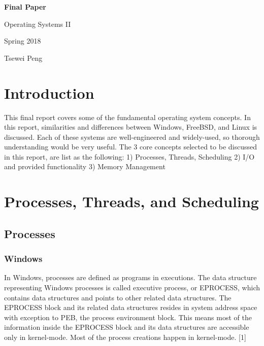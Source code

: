 \documentclass[10pt,a4paper]{article}
\def \CourseName{Operating Systems II}
\def \AssignmentTitle{Final Paper}
\def \Author{Tsewei Peng}
\def \Term{Spring 2018}
\begin{document}
\begin{titlepage}
    \vspace*{120px}
    \begin{center}
    {\huge \textbf{\AssignmentTitle}}\par
    \vspace{400px}
    {\Huge \CourseName}\par
    \vspace{10px}
    {\large\Term}\par
    \vspace{10px}
    \Large \Author
    \end{center}
    \vspace*{\fill}
\end{titlepage}



\section{Introduction}
This final report covers some of the fundamental operating system concepts. In this report, similarities and differences between Windows, FreeBSD, and Linux is discussed. Each of these systems are well-engineered and widely-used, so thorough understanding would be very useful. The 3 core concepts selected to be discussed in this report, are list as the following: 1) Processes, Threads, Scheduling 2) I/O and provided functionality 3) Memory Management

\section{Processes, Threads, and Scheduling}

\subsection{Processes}
\subsubsection{Windows}
In Windows, processes are defined as programs in executions. The data structure representing Windows processes is called executive process, or EPROCESS, which contains data structures and points to other related data structures. The EPROCESS block and its related data structures resides in system address space with exception to PEB, the process environment block. This means most of the information inside the EPROCESS block and its data structures are accessible only in kernel-mode. Most of the process creations happen in kernel-mode. [1]
\end{document}
